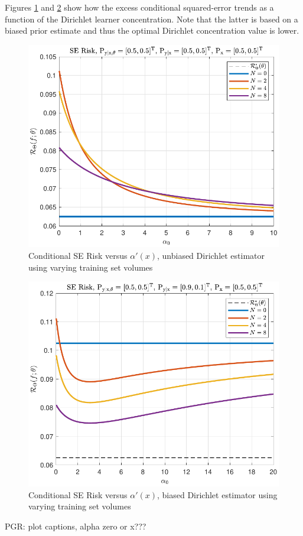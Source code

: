 \documentclass[12pt]{report}
\begin{document}
Figures \ref{fig:Risk_cond_SE_Dir_a0_leg_N_unbiased} and \ref{fig:Risk_cond_SE_Dir_a0_leg_N_biased} show how the excess conditional squared-error trends as a function of the Dirichlet learner concentration. Note that the latter is based on a biased prior estimate and thus the optimal Dirichlet concentration value is lower.
\begin{figure}
\centering
\includegraphics[width=0.7\linewidth]{Risk_cond_SE_Dir_a0_leg_N_unbiased.pdf}
\caption{Conditional SE Risk versus $\alpha'(x)$, unbiased Dirichlet estimator using varying training set volumes}
\label{fig:Risk_cond_SE_Dir_a0_leg_N_unbiased}
\end{figure}
\begin{figure}
\centering
\includegraphics[width=0.7\linewidth]{Risk_cond_SE_Dir_a0_leg_N_biased.pdf}
\caption{Conditional SE Risk versus $\alpha'(x)$, biased Dirichlet estimator using varying training set volumes}
\label{fig:Risk_cond_SE_Dir_a0_leg_N_biased}
\end{figure}

PGR: plot captions, alpha zero or x???
\end{document}
